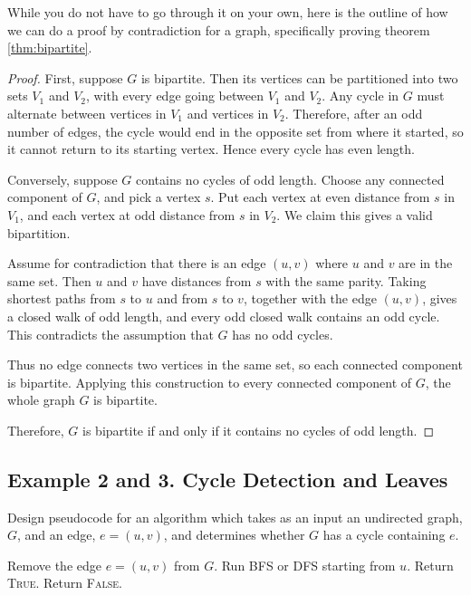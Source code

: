 While you do not have to go through it on your own, here is the outline of how we can do a proof by contradiction for a graph, specifically proving theorem \ref{thm:bipartite}.
\begin{proof}

First, suppose \(G\) is bipartite. Then its vertices can be partitioned into two sets
\(V_1\) and \(V_2\), with every edge going between \(V_1\) and \(V_2\). Any cycle in \(G\)
must alternate between vertices in \(V_1\) and vertices in \(V_2\). Therefore, after an
odd number of edges, the cycle would end in the opposite set from where it started,
so it cannot return to its starting vertex. Hence every cycle has even length.

Conversely, suppose \(G\) contains no cycles of odd length. Choose any connected
component of \(G\), and pick a vertex \(s\). Put each vertex at even distance from \(s\)
in \(V_1\), and each vertex at odd distance from \(s\) in \(V_2\). We claim this gives a
valid bipartition.

Assume for contradiction that there is an edge \((u,v)\) where \(u\) and \(v\) are in the
same set. Then \(u\) and \(v\) have distances from \(s\) with the same parity. Taking
shortest paths from \(s\) to \(u\) and from \(s\) to \(v\), together with the edge
\((u,v)\), gives a closed walk of odd length, and every odd closed walk contains an odd cycle. This contradicts the assumption that \(G\)
has no odd cycles.

Thus no edge connects two vertices in the same set, so each connected component is
bipartite. Applying this construction to every connected component of \(G\), the whole
graph \(G\) is bipartite.

Therefore, \(G\) is bipartite if and only if it contains no cycles of odd length.
\end{proof}

\subsection{Example 2 and 3. Cycle Detection and Leaves}
\begin{Exercise}[title={Cycle Detection}, label={ex:proofs_cycle}]

Design pseudocode for an algorithm which takes as an input an undirected graph, $G$, and an edge,
$e = (u, v)$, and determines whether $G$ has a cycle containing $e$.
\end{Exercise}
\begin{Answer}[ref={ex:proofs_cycle}]


\begin{algorithmic}
\State Remove the edge \(e=(u,v)\) from \(G\).
\State Run BFS or DFS starting from \(u\).
    \State Return \textsc{True}.
\Else
    \State Return \textsc{False}.
\EndIf
\end{algorithmic}
\end{Answer}

